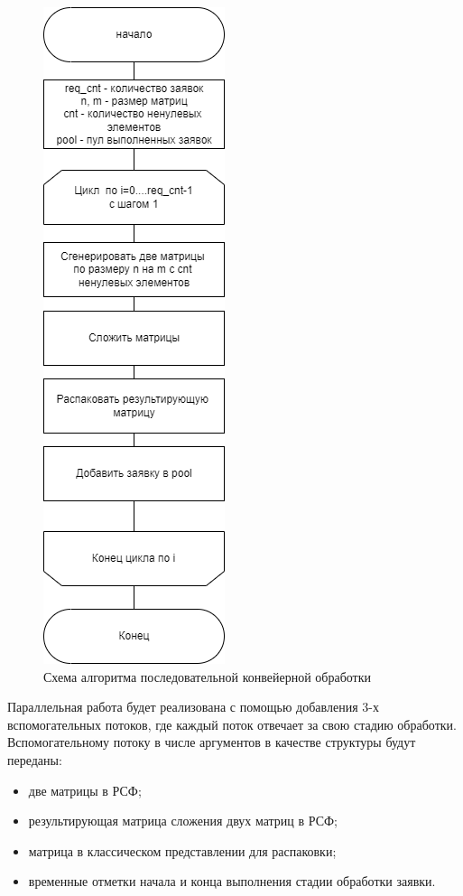 \begin{figure}[h]
	\centering
	\includegraphics[height=0.8\textheight]{img/linear.png}
	\caption{Схема алгоритма последовательной конвейерной обработки}
	\label{fig:linear}
\end{figure}

\clearpage

Параллельная работа будет реализована с помощью добавления 3-х вспомогательных потоков, где каждый поток отвечает за свою стадию обработки.
Вспомогательному потоку в числе аргументов в качестве структуры будут переданы:
\begin{itemize}
	\item две матрицы в РСФ;
	\item результирующая матрица сложения двух матриц в РСФ;
	\item матрица в классическом представлении для распаковки;
	\item временные отметки начала и конца выполнения стадии обработки заявки.
\end{itemize}

